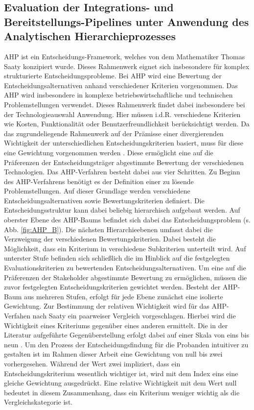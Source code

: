 \subsection{Evaluation der Integrations- und Bereitstellungs-Pipelines unter Anwendung des Analytischen Hierarchieprozesses}
AHP ist ein Entscheidungs-Framework, welches von dem Mathematiker Thomas Saaty konzipiert wurde. Dieses Rahmenwerk eignet sich insbesondere für komplex strukturierte Entscheidungsprobleme. Bei AHP wird eine Bewertung der Entscheidungsalternativen anhand verschiedener Kriterien vorgenommen. Das AHP wird insbesondere in komplexe betriebswirtschaftliche und technischen Problemstellungen verwendet. Dieses Rahmenwerk findet dabei insbesondere bei der Technologieauswahl Anwendung. Hier müssen i.d.R. verschiedene Kriterien wie Kosten, Funktionalität oder Benutzerfreundlichkeit berücksichtigt werden. Da das zugrundeliegende Rahmenwerk auf der Prämisse einer divergierenden Wichtigkeit der unterschiedlichen Entscheidungskriterien basiert, muss für diese eine Gewichtung vorgenommen werden \cite[86]{Saaty.2008}. Diese ermöglicht eine auf die Präferenzen der Entscheidungsträger abgestimmte Bewertung der verschiedenen Technologien. Das AHP-Verfahren besteht dabei aus vier Schritten. Zu Beginn des AHP-Verfahrens benötigt es der Definition einer zu lösende Problemstellungen. Auf dieser Grundlage werden verschiedene Entscheidungsalternativen sowie Bewertungskriterien definiert. Die Entscheidungsstruktur kann dabei beliebig hierarchisch aufgebaut werden. Auf oberster Ebene des AHP-Baums befindet sich dabei das Entscheidungsproblem (s. Abb. \ref*{fig:AHP_B}). Die nächsten Hierarchieebenen umfasst dabei die Verzweigung der verschiedenen Bewertungskriterien. Dabei besteht die Möglichkeit, dass ein Kriterium in verschiedene Subkriterien unterteilt wird. Auf unterster Stufe befinden sich schließlich die im Hinblick auf die festgelegten Evaluationskriterien zu bewertenden Entscheidungsalternativen. Um eine auf die Präferenzen der Stakeholder abgestimmte Bewertung zu ermöglichen, müssen die zuvor festgelegten Entscheidungskriterien gewichtet werden. Besteht der AHP-Baum aus mehreren Stufen, erfolgt für jede Ebene zunächst eine isolierte Gewichtung. Zur Bestimmung der relativen Wichtigkeit wird für das AHP-Verfahen nach Saaty ein paarweiser Vergleich vorgeschlagen. Hierbei wird die Wichtigkeit eines Kriteriums gegenüber eines anderen ermittelt. Die in der Literatur aufgeführte Gegenüberstellung erfolgt dabei auf einer Skala von eins bis neun \cite[86]{Saaty.2008}. Um den Prozess der Entscheidungsfindung für die Probanden intuitiver zu gestalten ist im Rahmen dieser Arbeit eine Gewichtung von null bis zwei vorhergesehen. Während der Wert zwei impliziert, dass ein Entscheidungskriterium wesentlich wichtiger ist, wird mit dem Index eins eine gleiche Gewichtung ausgedrückt. Eine relative Wichtigkeit mit dem Wert null bedeutet in diesem Zusammenhang, dass ein Kriterium weniger wichtig als die Vergleichskategorie ist.  
